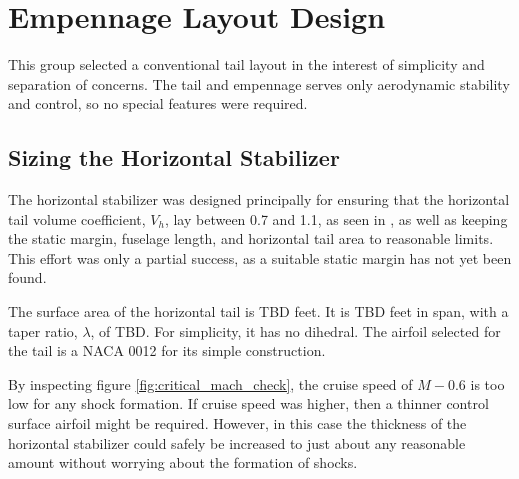 \documentclass[conf]{new-aiaa}
\begin{document}
\section{Empennage Layout Design}

This group selected a conventional tail layout in the interest of simplicity and separation of concerns. The tail and empennage serves only aerodynamic stability and control, so no special features were required.

\subsection{Sizing the Horizontal Stabilizer} %

The horizontal stabilizer was designed principally for ensuring that the horizontal tail volume coefficient, $V_h$, lay between 0.7 and 1.1, as seen in \cite{orange_book}, as well as keeping the static margin, fuselage length, and horizontal tail area to reasonable limits. This effort was only a partial success, as a suitable static margin has not yet been found. 


The surface area of the horizontal tail is TBD feet. It is TBD feet in span, with a taper ratio, $\lambda$, of TBD. For simplicity, it has no dihedral. The airfoil selected for the tail is a NACA 0012 for its simple construction.

By inspecting figure \ref{fig:critical_mach_check}, the cruise speed of $M-0.6$ is too low for any shock formation. If cruise speed was higher, then a thinner control surface airfoil might be required. However, in this case the thickness of the horizontal stabilizer could safely be increased to just about any reasonable amount without worrying about the formation of shocks.
\end{document}
